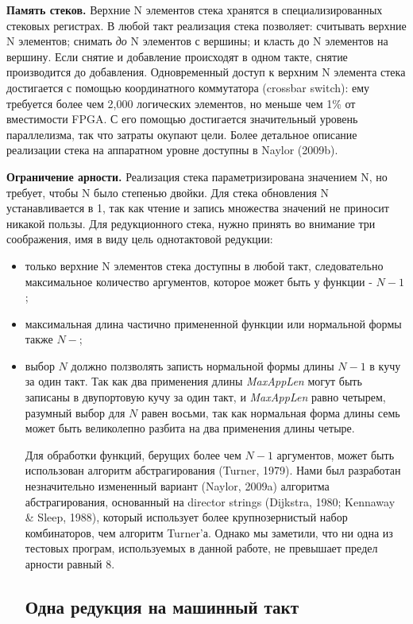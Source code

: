 \documentclass[flenqn, 14pt]{extarticle}
\begin{document}
\textbf{Память стеков.} Верхние N элементов стека хранятся в специализированных стековых регистрах. В любой такт реализация стека позволяет: считывать верхние N элементов; снимать \textit{до} N элементов с вершины; и класть до N элементов на вершину. Если снятие и добавление происходят в одном такте, снятие производится до добавления. Одновременный доступ к верхним N элемента стека достигается с помощью координатного коммутатора (crossbar switch): ему требуется более чем 2,000 логических элементов, но меньше чем 1\% от вместимости FPGA. С его помощью достигается значительный уровень параллелизма, так что затраты окупают цели. Более детальное описание реализации стека на аппаратном уровне доступны в Naylor (2009b). 

\textbf{Ограничение арности.} Реализация стека параметризирована значением N, но требует, чтобы N было степенью двойки. Для стека обновления N устанавливается в 1, так как чтение и запись множества значений не приносит никакой пользы. Для редукционного стека,  нужно принять во внимание три соображения, имя в виду цель однотактовой редукции:
\begin{itemize}
\item только верхние N элементов стека доступны в любой такт, следовательно максимальное количество аргументов, которое может быть у функции - $N-1$; 
\item максимальная длина частично примененной функции или нормальной формы также $N-$;
\item выбор $N$ должно ползволять записть нормальной формы длины $N-1$ в кучу за один такт.
Так как два применения длины \textit{MaxAppLen} могут быть записаны в двупортовую кучу за один такт, и \textit{MaxAppLen} равно четырем, разумный выбор для $N$ равен восьми, так как нормальная форма длины семь может быть великолепно разбита на два применения длины четыре.

Для обработки функций, берущих более чем $N-1$ аргументов, может быть использован алгоритм абстрагирования (Turner, 1979). Нами был разработан незначительно измененный вариант (Naylor, 2009a) алгоритма абстрагирования, основанный на director strings (Dijkstra, 1980; Kennaway \& Sleep, 1988), который использует более крупнозернистый набор комбинаторов, чем алгоритм Turner'а. Однако мы заметили, что ни одна из тестовых програм, используемых в данной работе, не превышает предел арности равный 8.

\subsection{Одна редукция на машинный такт}

\end{itemize}
\end{document}
